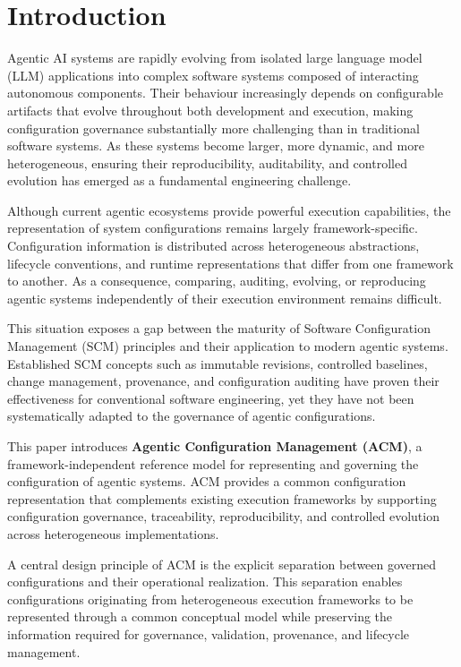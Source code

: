 \documentclass[10pt]{article}
\begin{document}
\section{Introduction}

Agentic AI systems are rapidly evolving from isolated large language model (LLM) applications into complex software systems composed of interacting autonomous components. Their behaviour increasingly depends on configurable artifacts that evolve throughout both development and execution, making configuration governance substantially more challenging than in traditional software systems. As these systems become larger, more dynamic, and more heterogeneous, ensuring their reproducibility, auditability, and controlled evolution has emerged as a fundamental engineering challenge.

Although current agentic ecosystems provide powerful execution capabilities, the representation of system configurations remains largely framework-specific. Configuration information is distributed across heterogeneous abstractions, lifecycle conventions, and runtime representations that differ from one framework to another. As a consequence, comparing, auditing, evolving, or reproducing agentic systems independently of their execution environment remains difficult.

This situation exposes a gap between the maturity of Software Configuration Management (SCM) principles and their application to modern agentic systems. Established SCM concepts such as immutable revisions, controlled baselines, change management, provenance, and configuration auditing have proven their effectiveness for conventional software engineering, yet they have not been systematically adapted to the governance of agentic configurations.

This paper introduces \textbf{Agentic Configuration Management (ACM)}, a framework-independent reference model for representing and governing the configuration of agentic systems. ACM provides a common configuration representation that complements existing execution frameworks by supporting configuration governance, traceability, reproducibility, and controlled evolution across heterogeneous implementations.

A central design principle of ACM is the explicit separation between governed configurations and their operational realization. This separation enables configurations originating from heterogeneous execution frameworks to be represented through a common conceptual model while preserving the information required for governance, validation, provenance, and lifecycle management.
\end{document}
